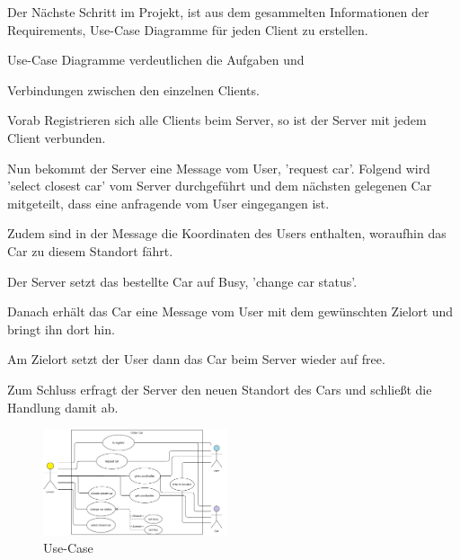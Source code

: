 Der Nächste Schritt im Projekt, ist aus dem gesammelten Informationen der Requirements, Use-Case Diagramme für jeden Client zu erstellen.


Use-Case Diagramme verdeutlichen die 
Aufgaben und 

Verbindungen zwischen den einzelnen Clients.


Vorab Registrieren sich alle Clients beim Server, so ist der Server mit jedem Client verbunden.


Nun bekommt der Server eine Message vom User, 'request car'.
Folgend wird 'select closest car' vom Server durchgeführt und dem nächsten gelegenen Car mitgeteilt, dass eine anfragende vom User eingegangen ist.

Zudem sind in der Message die Koordinaten des Users enthalten, woraufhin das Car zu diesem Standort fährt.

Der Server setzt das bestellte Car auf Busy, 'change car status'.


Danach erhält das Car eine Message vom User mit dem gewünschten Zielort und bringt ihn dort hin.


Am Zielort setzt der User dann das Car beim Server wieder auf free.


Zum Schluss erfragt der Server den neuen Standort des Cars und schließt die Handlung damit ab.



\begin{figure}[htbp] 
  \centering
     \includegraphics[width=0.48\textwidth]{Use-Case_Server.png}
     \caption{Use-Case}
\end{figure}


